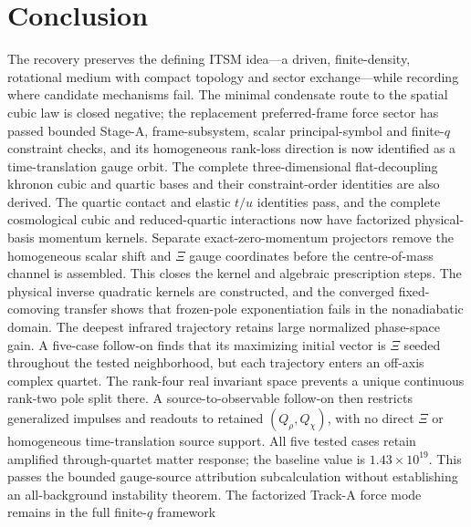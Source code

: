 ﻿\documentclass[11pt]{article}
\begin{document}











\section*{Conclusion}

The recovery preserves the defining ITSM idea---a driven, finite-density,
rotational medium with compact topology and sector exchange---while recording
where candidate mechanisms fail.  The minimal condensate route to the spatial
cubic law is closed negative; the replacement preferred-frame force sector has
passed bounded Stage-A, frame-subsystem, scalar principal-symbol and finite-$q$
constraint checks, and its homogeneous rank-loss direction is now identified
as a time-translation gauge orbit.  The complete three-dimensional
flat-decoupling khronon cubic and quartic bases and their constraint-order
identities are also derived.  The quartic contact and elastic $t/u$ identities
pass, and the complete cosmological cubic and reduced-quartic interactions
now have factorized
physical-basis momentum kernels.  Separate exact-zero-momentum projectors
remove the homogeneous scalar shift and $\Xi$ gauge coordinates before the
centre-of-mass channel is assembled.  This closes the kernel and algebraic
prescription steps.  The physical inverse quadratic kernels are constructed,
and the converged fixed-comoving transfer shows that frozen-pole exponentiation
fails in the nonadiabatic domain.  The deepest infrared trajectory retains
large normalized phase-space gain.  A five-case follow-on finds that its
maximizing initial vector is $\Xi$ seeded throughout the tested neighborhood,
but each trajectory enters an off-axis complex quartet.  The rank-four real
invariant space prevents a unique continuous rank-two pole split there.  A
source-to-observable follow-on then restricts generalized impulses and
readouts to retained $(Q_\rho,Q_\chi)$, with no direct $\Xi$ or homogeneous
time-translation source support.  All five tested cases retain amplified
through-quartet matter response; the baseline value is
$1.43\times10^{19}$.  This passes the bounded gauge-source attribution
subcalculation without establishing an all-background instability theorem.
The factorized Track-A force mode remains in the full finite-$q$ framework
\end{document}
